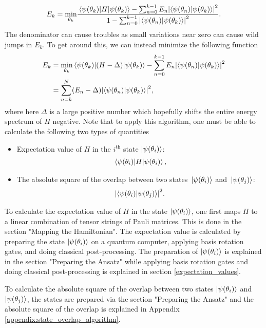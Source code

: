 \documentclass[Dual]{msu-thesis}
\begin{document}
\begin{align}
E_k=\underset{\theta_k}{\min}\frac{\mel{\psi(\theta_k)}{H}{\psi(\theta_k)}-\sum_{n=0}^{k-1}E_n\abs{\bra{\psi(\theta_n)}\ket{\psi(\theta_k)}}^2}{1-\sum_{n=0}^{k-1}\abs{\bra{\psi(\theta_n)}\ket{\psi(\theta_k)}}^2}.
\end{align}
The denominator can cause troubles as small variations near zero can cause wild jumps in $E_k$. To get around this, we can instead minimize the following function
\begin{align}
\label{excited_alt}
E_k
&=
\underset{\theta_k}{\min}\mel{\psi(\theta_k)}{(H-\Delta)}{\psi(\theta_k)}-\sum_{n=0}^{k-1}E_n\abs{\bra{\psi(\theta_n)}\ket{\psi(\theta_k)}}^2
\\
&=
\sum_{n=k}^{N}(E_n-\Delta)\abs{\bra{\psi(\theta_n)}\ket{\psi(\theta_k)}}^2,
\end{align}
where here $\Delta$ is a large positive number which hopefully shifts the entire energy spectrum of $H$ negative. Note that to apply this algorithm, one must be able to calculate the following two types of quantities
\begin{itemize}
    \item Expectation value of $H$ in the $i^{\text{th}}$ state $\ket{\psi(\theta_i)}$: 
    \begin{align}
    \mel{\psi(\theta_i)}{H}{\psi(\theta_i)},    
    \end{align}
    \item The absolute square of the overlap between two states $\ket*{\psi(\theta_i)}$ and $\ket*{\psi(\theta_j)}$:
    \begin{align}
    \abs{\bra{\psi(\theta_i)}\ket{\psi(\theta_j)}}^2.
    \end{align}
\end{itemize}

To calculate the expectation value of $H$ in the state $\ket{\psi(\theta_i)}$, one first maps $H$ to a linear combination of tensor strings of Pauli matrices. This is done in the section "Mapping the Hamiltonian". The expectation value is calculated by preparing the state $\ket{\psi(\theta_i)}$ on a quantum computer, applying basis rotation gates, and doing classical post-processing. The preparation  of $\ket{\psi(\theta_i)}$ is explained in the section "Preparing the Ansatz"  while applying basis rotation gates and doing classical post-processing is explained in section \ref{expectation_values}.

To calculate the absolute square of the overlap between two states $\ket{\psi(\theta_i)}$ and $\ket{\psi(\theta_j)}$, the states are prepared via the section "Preparing the Ansatz" and the absolute square of the overlap is explained in Appendix \ref{appendix:state_overlap_algorithm}.
\end{document}
